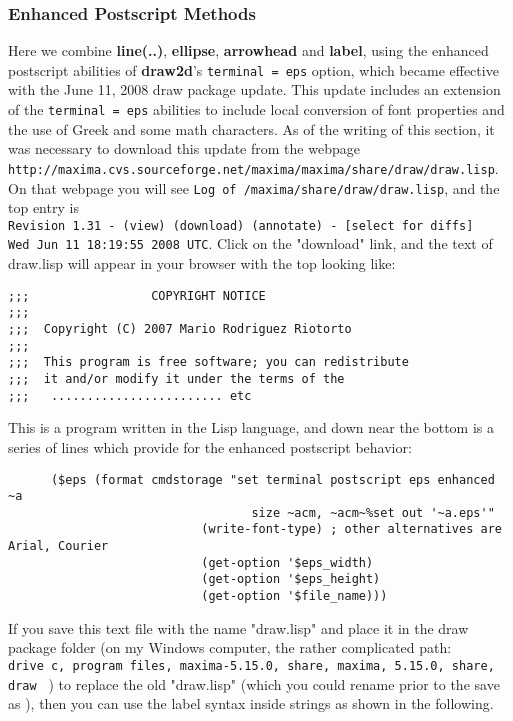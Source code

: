 \documentclass[12pt]{article}
\begin{document}
\subsubsection{Enhanced Postscript Methods}
Here we combine \textbf{line(..)}, \textbf{ellipse},  \textbf{arrowhead}
  and \textbf{label}, using the enhanced postscript abilities of 
  \textbf{draw2d}'s \verb|terminal = eps| option, which became
  effective with the June 11, 2008 draw package update.
This update includes an extension of the  \verb|terminal = eps| abilities to
 include local conversion of font properties and the use of Greek and some math characters.
As of the writing of this section, it was necessary to download this update
 from the webpage\\
 \verb|http://maxima.cvs.sourceforge.net/maxima/maxima/share/draw/draw.lisp|.
On that webpage you will see \verb|Log of /maxima/share/draw/draw.lisp|, and
  the top entry is\\
  \verb|Revision 1.31 - (view) (download) (annotate) - [select for diffs] |\\
  \verb|Wed Jun 11 18:19:55 2008 UTC|.
Click on the "download" link, and the text of draw.lisp will appear in your
  browser with the top looking like:
\small
\begin{verbatim}
;;;                 COPYRIGHT NOTICE
;;;  
;;;  Copyright (C) 2007 Mario Rodriguez Riotorto
;;;  
;;;  This program is free software; you can redistribute
;;;  it and/or modify it under the terms of the
;;;   ........................ etc
\end{verbatim}
\normalsize
This is a program written in the Lisp language, and down near the bottom is a
series of lines which provide for the enhanced postscript behavior:
\small
\begin{verbatim}
      ($eps (format cmdstorage "set terminal postscript eps enhanced ~a
                            	  size ~acm, ~acm~%set out '~a.eps'"
                           (write-font-type) ; other alternatives are Arial, Courier
                           (get-option '$eps_width)
                           (get-option '$eps_height)
                           (get-option '$file_name)))
\end{verbatim}
\normalsize
If you save this text file with the name "draw.lisp" and place it in the draw package
  folder (on my Windows computer, the rather complicated path:\\
\verb|drive c, program files, maxima-5.15.0, share, maxima, 5.15.0, share, draw | )
to replace the old "draw.lisp" (which you could rename prior to the save as ),
  then you can use the label syntax inside strings as shown in the following.
  
\end{document}
